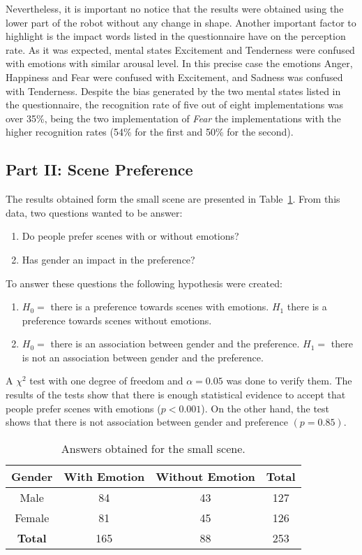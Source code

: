 Nevertheless, it is important no notice that the results were obtained using the lower part of the robot without any change in shape. Another important factor to highlight is the impact words listed in the questionnaire have on the perception rate. As it was expected, mental states Excitement and Tenderness were confused with emotions with similar arousal level. In this precise case the emotions Anger, Happiness and Fear were confused with Excitement, and Sadness was confused with Tenderness. Despite the bias generated by the two mental states listed in the questionnaire, the recognition rate of five out of eight implementations was over 35\%, being the two implementation of \textit{Fear} the implementations with the higher recognition rates (54\% for the first and 50\% for the second).

\subsection{Part II: Scene Preference}

The results obtained form the small scene are presented in Table~\ref{table:preference_selection}. From this data, two questions wanted to be answer:
\begin{enumerate}
	\item Do people prefer scenes with or without emotions?
	\item Has gender an impact in the preference?
\end{enumerate}
To answer these questions the following hypothesis were created:
\begin{enumerate}
	\item $H_0 =$ there is a preference towards scenes with emotions. $H_1$ there is a preference towards scenes without emotions. 
	\item $H_0 =$ there is an association between gender and the preference. $H_1 =$ there is not an association between gender and the preference. 
\end{enumerate}
A $\chi^2$ test with one degree of freedom and $\alpha = 0.05$ was done to verify them. The results of the tests show that there is enough statistical evidence to accept that people prefer scenes with emotions ($p<0.001$). On the other hand, the test shows that there is not association between gender and preference $(p=0.85)$.

\begin{table}
\centering
		\caption{Answers obtained for the small scene.}		
		\label{table:preference_selection}
			\begin{tabular}{|c|c|c|c|}
			\hline
			\textbf{Gender}&\textbf{With Emotion}&\textbf{Without Emotion}&\textbf{Total}\\
			\hline
			Male & 84 & 43 & 127\\
			\hline
			Female & 81 & 45 & 126\\
			\hline
			\textbf{Total} & 165 & 88 & 253\\
			\hline
			\end{tabular}
\end{table}
